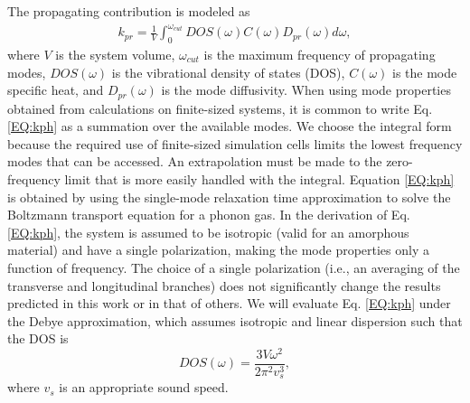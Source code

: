 \documentclass[aps,prb,twocolumn,superscriptaddress,footinbib,amsmath,amssymb,floatfix]{revtex4}
\begin{document}
The propagating contribution is modeled as
\cite{feldman_thermal_1993,feldman_numerical_1999} 
\begin{equation}\label{EQ:kph}
\begin{split}
k_{pr} = \frac{1}{V}\int_{0}^{\omega_{cut}} 
DOS(\omega) C(\omega) D_{pr}(\omega)d\omega,
\end{split}
\end{equation}
where $V$ is the system volume, $\omega_{cut}$ is the maximum 
frequency of propagating modes,  
$DOS(\omega)$ is the vibrational 
density of states (DOS), $C(\omega)$ is the mode specific heat, 
and $D_{pr}(\omega)$ is the mode diffusivity. When using mode 
properties obtained from calculations on finite-sized systems, 
it is common 
to write Eq. \eqref{EQ:kph} as a summation over the available modes.
\cite{feldman_thermal_1993,feldman_numerical_1999}
We choose the integral form because the required use of finite-sized 
simulation cells limits the lowest frequency 
modes that can be accessed. An extrapolation 
must be made to the zero-frequency limit that is more easily 
handled with the integral.
\cite{love_estimate_1990,feldman_thermal_1993,cahill_thermal_1994,
feldman_numerical_1999,baldi_thermal_2008,
liu_high_2009,yang_anomalously_2010}    
Equation \eqref{EQ:kph} is obtained by using the single-mode relaxation
time approximation to solve 
the Boltzmann transport equation for a phonon gas.
\cite{ziman_electrons_2001} In the derivation of Eq. 
\eqref{EQ:kph}, the system is assumed to be isotropic 
(valid for an amorphous material) 
and have a single polarization, 
making the mode properties only a function of frequency. The 
choice of a single polarization (i.e., an averaging 
of the transverse and longitudinal branches) 
does not significantly change the results predicted in this work  
or in that of others.
\cite{feldman_thermal_1993,cahill_thermal_1994,
feldman_numerical_1999,baldi_thermal_2008,liu_high_2009,
yang_anomalously_2010} 
We will evaluate Eq. \eqref{EQ:kph} under the Debye approximation, 
which assumes isotropic and linear dispersion such that the DOS is
\begin{equation}\label{EQ:DOS_debye}
DOS(\omega) = \frac{3V\omega^2}{2\pi^2v_{s}^3},
\end{equation}
where $v_s$ is an appropriate sound speed. 
\end{document}
